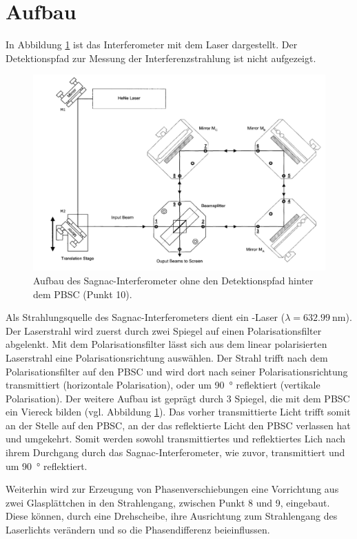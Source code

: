 \section{Aufbau}
In Abbildung \ref{fig:Aufbau} ist das Interferometer mit dem Laser dargestellt. Der Detektionspfad zur Messung der Interferenzstrahlung ist nicht aufgezeigt.
\begin{figure}
  \centering
  \includegraphics[width = .8\textwidth]{bilder/Aufbau.png}
  \caption{Aufbau des Sagnac-Interferometer ohne den Detektionspfad hinter dem PBSC (Punkt 10).}
  \label{fig:Aufbau}
\end{figure}
Als Strahlungsquelle des Sagnac-Interferometers dient ein -Laser ($\lambda = \SI{632.99}{\nano\meter}$).
Der Laserstrahl wird zuerst durch zwei Spiegel auf einen Polarisationsfilter abgelenkt.
Mit dem Polarisationsfilter lässt sich aus dem linear polarisierten Laserstrahl eine Polarisationsrichtung auswählen.
Der Strahl trifft nach dem Polarisationsfilter auf den PBSC und wird dort nach seiner Polarisationsrichtung transmittiert (horizontale Polarisation), oder um \SI{90}{\degree} reflektiert (vertikale Polarisation).
Der weitere Aufbau ist geprägt durch 3 Spiegel, die mit dem PBSC ein Viereck bilden (vgl. Abbildung \ref{fig:Aufbau}).
Das vorher transmittierte Licht trifft somit an der Stelle auf den PBSC, an der das reflektierte Licht den PBSC verlassen hat und umgekehrt.
Somit werden sowohl transmittiertes und reflektiertes Lich nach ihrem Durchgang durch das Sagnac-Interferometer, wie zuvor, transmittiert und um \SI{90}{\degree} reflektiert.
\par\medskip
Weiterhin wird zur Erzeugung von Phasenverschiebungen eine Vorrichtung aus zwei Glasplättchen in den Strahlengang, zwischen Punkt 8 und 9, eingebaut.
Diese können, durch eine Drehscheibe, ihre Ausrichtung zum Strahlengang des Laserlichts verändern und so die Phasendifferenz beieinflussen.
